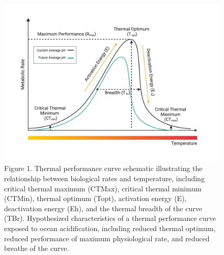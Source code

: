 \documentclass[
]{article}
\begin{document}
\begin{figure}[htbp]
    \centering
    \includegraphics[width=1\textwidth]{Images/thermal_performance_curve_schematic.png}
    \caption{Figure 1. Thermal performance curve schematic illustrating the relationship between biological rates and temperature, including critical thermal maximum (CTMax), critical thermal minimum (CTMin), thermal optimum (Topt), activation energy (E), deactivation energy (Eh), and the thermal breadth of the curve (TBr). Hypothesized characteristics of a thermal performance curve exposed to ocean acidification, including reduced thermal optimum, reduced performance of maximum physiological rate, and reduced breathe of the curve.}
    \label{fig:thermal-performance-curve-schematic}
\end{figure}
\end{document}
